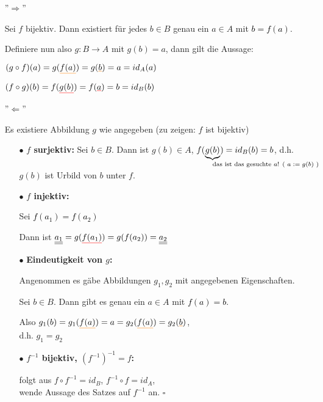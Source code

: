 \documentclass[a4paper, 12pt, twoside] {article}
\begin{document}
\begin{itemize}

\item[''$\Rightarrow$'']

Sei $f$ bijektiv. Dann existiert für jedes $b \in B$ genau ein $a \in A$ mit \textcolor{orange}{\underline{\textcolor{black}{$b = f(a)$}}}.

Definiere nun also $g: B \rightarrow A$ mit \color{red} \underline{\color{black} $g(b)=a$}\color{black}, dann gilt die Aussage:

$(g \circ f) (a) = g(\textcolor{orange}{\underline{\textcolor{black}{f(a)}}}) = g(\textcolor{orange}{\underline{\textcolor{black}{b}}}) = a = id_A(a)$

$(f \circ g) (b) = f(\textcolor{red}{\underline{\textcolor{black}{g(b)}}}) = f(\textcolor{red}{\underline{\textcolor{black}{a}}}) = b = id_B(b)$

\item[''$\Leftarrow$'']

Es existiere Abbildung $g$ wie angegeben (zu zeigen: $f$ ist bijektiv)

\begin{itemize}
\item[$\bullet$] \textbf{$f$ surjektiv:} Sei $b \in B$. Dann ist $g(b) \in A$, $f(\underbrace{g(b)}_{\mathrlap{\text{das ist das gesuchte $a$! ( $a := g(b)$ )}}}) = id_B(b) = b$, d.h. $g(b)$ ist Urbild von $b$ unter $f$.

\item[$\bullet$] \textbf{$f$ injektiv:} 

Sei \textcolor{red}{\underline{\textcolor{black}{$f(a_1) = f(a_2)$}}}

Dann ist $\underline{\underline{a_1}} = g(\textcolor{red}{\underline{\textcolor{black}{f(a_1)}}}) = g(f(a_2)) = \underline{\underline{a_2}}$

\item[$\bullet$] \textbf{Eindeutigkeit von $g$:} 

Angenommen es gäbe Abbildungen $g_1,g_2$ mit angegebenen Eigenschaften.

Sei $b \in B$. Dann gibt es genau ein $a \in A$ mit \textcolor{orange}{\underline{\textcolor{black}{$f(a)=b$}}}.

Also $g_1(b) = g_1(\textcolor{orange}{\underline{\textcolor{black}{f(a)}}}) = a = g_2(\textcolor{orange}{\underline{\textcolor{black}{f(a)}}}) = g_2(\textcolor{orange}{\underline{\textcolor{black}{b}}})$, \\
d.h. $g_1 = g_2$

\item[$\bullet$] \textbf{$f^{-1}$ bijektiv, $(f^{-1})^{-1} = f$:}

folgt aus $f \circ f^{-1} = id_B$, $f^{-1} \circ f = id_A$, \\
wende Aussage des Satzes auf $f^{-1}$ an. \hfill $\square$

\end{itemize}

\end{itemize}
\end{document}
